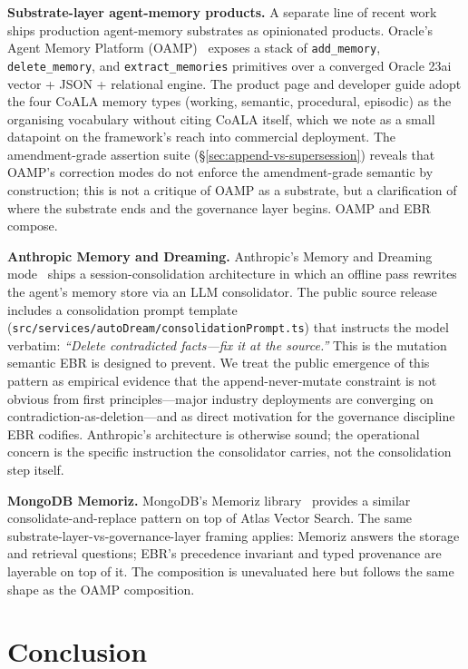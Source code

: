 \documentclass[11pt,a4paper]{article}
\begin{document}
\noindent
\textbf{Substrate-layer agent-memory products.} A separate line of recent work ships
production agent-memory substrates as opinionated products. Oracle's Agent Memory
Platform (OAMP)~\cite{oracleOAMP2026} exposes a stack of \texttt{add\_memory},
\texttt{delete\_memory}, and \texttt{extract\_memories} primitives over a converged
Oracle 23ai vector + JSON + relational engine. The product page and developer guide
adopt the four CoALA memory types (working, semantic, procedural, episodic) as the
organising vocabulary without citing CoALA itself, which we note as a small datapoint
on the framework's reach into commercial deployment. The
amendment-grade assertion suite (\S\ref{sec:append-vs-supersession}) reveals that OAMP's
correction modes do not enforce the amendment-grade semantic by construction; this is
not a critique of OAMP as a substrate, but a clarification of where the substrate ends
and the governance layer begins. OAMP and EBR compose.

\noindent
\textbf{Anthropic Memory and Dreaming.} Anthropic's Memory and Dreaming
mode~\cite{anthropicMemoryDreaming2026} ships a session-consolidation architecture in
which an offline pass rewrites the agent's memory store via an LLM consolidator. The
public source release includes a consolidation prompt template
(\texttt{src/services/autoDream/consolidationPrompt.ts}) that instructs the model
verbatim: \emph{``Delete contradicted facts---fix it at the source.''} This is the
mutation semantic EBR is designed to prevent. We treat the public emergence of this
pattern as empirical evidence that the append-never-mutate constraint is not obvious
from first principles---major industry deployments are converging on
contradiction-as-deletion---and as direct motivation for the governance discipline EBR
codifies. Anthropic's architecture is otherwise sound; the operational concern is the
specific instruction the consolidator carries, not the consolidation step itself.

\noindent
\textbf{MongoDB Memoriz.} MongoDB's Memoriz library~\cite{mongoMemoriz2026} provides a
similar consolidate-and-replace pattern on top of Atlas Vector Search. The same
substrate-layer-vs-governance-layer framing applies: Memoriz answers the storage and
retrieval questions; EBR's precedence invariant and typed provenance are layerable on
top of it. The composition is unevaluated here but follows the same shape as the OAMP
composition.

\section{Conclusion}
\label{sec:conclusion}
\end{document}
